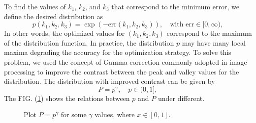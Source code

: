 \documentclass[12pt, a4paper, reprint, nofootinbib, twoside,  showkeys]{revtex4-1}
\begin{document}
To find the values of $ k_1 $, $ k_2 $, and $ k_3 $ that correspond to the minimum error, we define the desired distribution as
\begin{equation}
p\left(k_1,k_2,k_3\right) = \exp\left(-\text{err}\left(k_1,k_2,k_3\right)\right), \quad \text{with }\mathrm{err}\in [0,\infty),
\end{equation}
In other words, the optimized values for $\left(k_1,k_2,k_3\right)$ correspond to the maximum of the distribution function. In practice, the distribution $p$ may have many local maxima degrading the accuracy for the optimization strategy. To solve this problem, we used the concept of Gamma correction commonly adopted in image processing to improve the contrast between the peak and valley values for the distribution. The distribution with improved contrast can be given by
\begin{equation}
P = p^{\gamma},\quad p\in (0,1],
\end{equation}
The FIG. (\ref{fig:gamma-plot}) shows the relations between $p$ and $P$ under different.
\begin{figure}[h]

	\caption{Plot $P=p^\gamma$ for some $\gamma$ values, where $x\in[0,1]$.}
	\label{fig:gamma-plot}
\end{figure}

\end{document}
